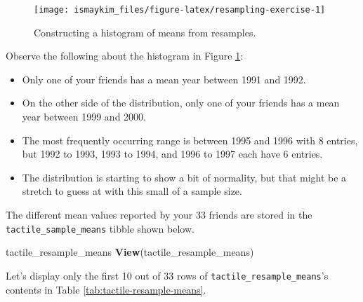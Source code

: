 \documentclass[12pt, krantz2,]{krantz}
\makeatletter
\newenvironment{Shaded}{\begin{snugshade}}{\end{snugshade}}
\newcommand{\KeywordTok}[1]{\textcolor[rgb]{0.27,0.27,0.27}{\textbf{#1}}}
\newcommand{\NormalTok}[1]{#1}
\providecommand{\tightlist}{%
  \setlength{\itemsep}{0pt}\setlength{\parskip}{0pt}}
\newenvironment{kframe}{%
\medskip{}
\setlength{\fboxsep}{.8em}
 \def\at@end@of@kframe{}%
 \ifinner\ifhmode%
  \def\at@end@of@kframe{\end{minipage}}%
  \begin{minipage}{\columnwidth}%
 \fi\fi%
 \def\FrameCommand##1{\hskip\@totalleftmargin \hskip-\fboxsep
 \colorbox{shadecolor}{##1}\hskip-\fboxsep
     \hskip-\linewidth \hskip-\@totalleftmargin \hskip\columnwidth}%
 \MakeFramed {\advance\hsize-\width
   \@totalleftmargin\z@ \linewidth\hsize
   \@setminipage}}%
 {\par\unskip\endMakeFramed%
 \at@end@of@kframe}
\renewenvironment{Shaded}{\begin{kframe}}{\end{kframe}}
\makeatother
\begin{document}
\begin{figure}

{\centering \texttt{[image: ismaykim\_files/figure-latex/resampling-exercise-1]} 

}

\caption{Constructing a histogram of means from resamples.}\label{fig:resampling-exercise}
\end{figure}

Observe the following about the histogram in Figure \ref{fig:resampling-exercise}:

\begin{itemize}
\tightlist
\item
  Only one of your friends has a mean year between 1991 and 1992.
\item
  On the other side of the distribution, only one of your friends has a mean year between 1999 and 2000.
\item
  The most frequently occurring range is between 1995 and 1996 with 8 entries, but 1992 to 1993, 1993 to 1994, and 1996 to 1997 each have 6 entries.
\item
  The distribution is starting to show a bit of normality, but that might be a stretch to guess at with this small of a sample size.
\end{itemize}

The different mean values reported by your 33 friends are stored in the \texttt{tactile\_sample\_means} tibble shown below.

\begin{Shaded}
\begin{Highlighting}[]
\NormalTok{tactile_resample_means}
\KeywordTok{View}\NormalTok{(tactile_resample_means)}
\end{Highlighting}
\end{Shaded}

Let's display only the first 10 out of 33 rows of \texttt{tactile\_resample\_means}'s contents in Table \ref{tab:tactile-resample-means}.

\begingroup\fontsize{10}{12}\selectfont
\end{document}
